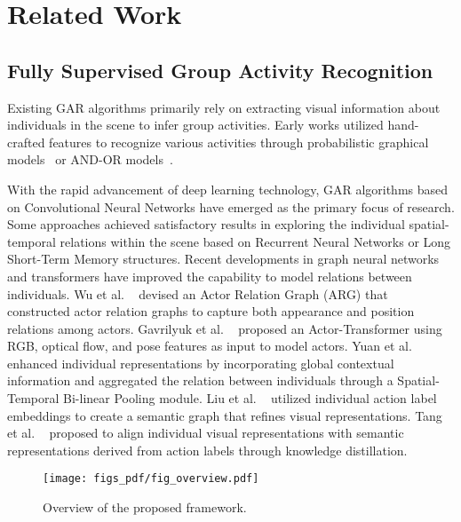 \section{Related Work}
\label{sec:related}
\subsection{Fully Supervised Group Activity Recognition}
Existing GAR algorithms primarily rely on extracting visual information about individuals in the scene to infer group activities. 
Early works utilized hand-crafted features to recognize various activities through probabilistic graphical models~\cite{lan2012social,Amer2013,amer2014hirf,Li2016Multiview} or AND-OR models~\cite{amer2012cost,choi2013understanding,shu2015joint}.

With the rapid advancement of deep learning technology, GAR algorithms based on Convolutional Neural Networks have emerged as the primary focus of research.
Some approaches \cite{deng2016structure,ibrahim2018hierarchical,ibrahim2016hierarchical,li2017sbgar,qi2018stagnet,shu2017cern,wang2017recurrent,yan2018participation,ibrahim2016hierarchical,shu2017cern,CCG,li2019nonlocal} achieved satisfactory results in exploring the individual spatial-temporal relations within the scene based on Recurrent Neural Networks or Long Short-Term Memory structures. 
Recent developments in graph neural networks and transformers have improved the capability to model relations between individuals. 
Wu et al. ~\cite{ARG} devised an Actor Relation Graph (ARG) that constructed actor relation graphs to capture both appearance and position relations among actors.
Gavrilyuk et al. ~\cite{gavrilyuk2020actor} proposed an Actor-Transformer using RGB, optical flow, and pose features as input to model actors. 
Yuan et al. ~\cite{yuan2021learning} enhanced individual representations by incorporating global contextual information and aggregated the relation between individuals through a Spatial-Temporal Bi-linear Pooling module. 
Liu et al. ~\cite{liu2021multimodal} utilized individual action label embeddings to create a semantic graph that refines visual representations. 
Tang et al. ~\cite{tang2019learning} proposed to align individual visual representations with semantic representations derived from action labels through knowledge distillation. 

\begin{figure*}
    \centering
    \texttt{[image: figs\_pdf/fig\_overview.pdf]}
    \caption{Overview of the proposed framework. 
    } 
    \label{fig_overview}
\end{figure*} 


